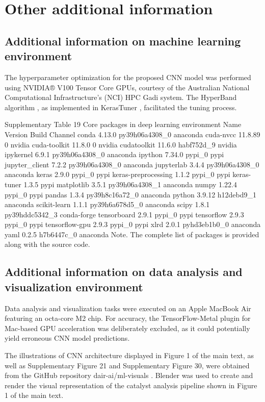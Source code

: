
\section{Other additional information}

\subsection{Additional information on machine learning environment}

The hyperparameter optimization for the proposed CNN model was performed using NVIDIA® V100 Tensor Core GPUs, courtesy of the Australian National Computational Infrastructure's (NCI) HPC Gadi system. The HyperBand algorithm \cite{li2018hyperband}, as implemented in KerasTuner \cite{omalley2019kerastuner} , facilitated the tuning process.

Supplementary Table 19
Core packages in deep learning environment
Name	Version	Build	Channel
conda	4.13.0	py39h06a4308_0	anaconda
cuda-nvcc	11.8.89	0	nvidia
cuda-toolkit	11.8.0	0	nvidia
cudatoolkit	11.6.0	habf752d_9	nvidia
ipykernel	6.9.1	py39h06a4308_0	anaconda
ipython	7.34.0	pypi_0	pypi
jupyter_client	7.2.2	py39h06a4308_0	anaconda
jupyterlab	3.4.4	py39h06a4308_0	anaconda
keras	2.9.0	pypi_0	pypi
keras-preprocessing	1.1.2	pypi_0	pypi
keras-tuner	1.3.5		pypi
matplotlib	3.5.1	py39h06a4308_1	anaconda
numpy	1.22.4	pypi_0	pypi
pandas	1.3.4	py39h8c16a72_0	anaconda
python	3.9.12	h12debd9_1	anaconda
scikit-learn	1.1.1	py39h6a678d5_0	anaconda
scipy	1.8.1	py39hddc5342_3	conda-forge
tensorboard	2.9.1	pypi_0	pypi
tensorflow	2.9.3	pypi_0	pypi
tensorflow-gpu	2.9.3	pypi_0	pypi
xlrd	2.0.1	pyhd3eb1b0_0	anaconda
yaml	0.2.5	h7b6447c_0	anaconda
Note. The complete list of packages is provided along with the source code.

\subsection{Additional information on data analysis and visualization environment}
Data analysis and visualization tasks were executed on an Apple MacBook Air featuring an octa-core M2 chip. For accuracy, the TensorFlow-Metal plugin for Mac-based GPU acceleration was deliberately excluded, as it could potentially yield erroneous CNN model predictions.

The illustrations of CNN architecture displayed in Figure 1 of the main text, as well as  Supplementary Figure 21 and Supplementary Figure 30, were obtained from the GitHub repository dair-ai/ml-visuals \cite{Saravia_ML_Visuals_2021}. Blender was used to create and render the visual representation of the catalyst analysis pipeline shown in Figure 1 of the main text.

